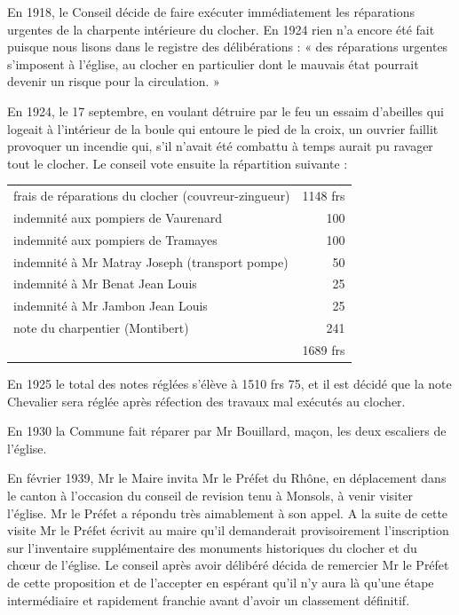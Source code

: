 En 1918, le Conseil décide de faire exécuter immédiatement les réparations urgentes de la charpente intérieure du clocher. En 1924 rien n'a encore été fait puisque nous lisons dans le registre des délibérations : « des réparations urgentes s'imposent à l'église, au clocher en particulier dont le mauvais état pourrait devenir un risque pour la circulation. »

En 1924, le 17 septembre, en voulant détruire par le feu un essaim d'abeilles qui logeait à l'intérieur de la boule qui entoure le pied de la croix, un ouvrier faillit provoquer un incendie qui, s'il n'avait été combattu à temps aurait pu ravager tout le clocher. Le conseil vote ensuite la répartition suivante :

\begin{center}
\begin{tabular}{@{}p{}r@{}}
frais de réparations du clocher (couvreur-zingueur) & 1148 frs \\
indemnité aux pompiers de Vaurenard & 100 \\
indemnité aux pompiers de Tramayes & 100 \\
indemnité à Mr Matray Joseph (transport pompe) & 50 \\
indemnité à Mr Benat Jean Louis & 25 \\
indemnité à Mr Jambon Jean Louis & 25 \\
note du charpentier (Montibert) & 241 \\
\multicolumn{2}{r}{1689 frs}
\end{tabular}
\end{center}

En 1925 le total des notes réglées s'élève à 1510 frs 75, et il est décidé que la note Chevalier sera réglée après réfection des travaux mal exécutés au clocher.

En 1930 la Commune fait réparer par Mr Bouillard, maçon, les deux escaliers de l'église.

En février 1939, Mr le Maire invita Mr le Préfet du Rhône, en déplacement dans le canton à l'occasion du conseil de revision tenu à Monsols, à venir visiter l'église. Mr le Préfet a répondu très aimablement à son appel. A la suite de cette visite Mr le Préfet écrivit au maire qu'il demanderait provisoirement l'inscription sur l'inventaire supplémentaire des monuments historiques du clocher et du chœur de l'église. Le conseil après avoir délibéré décida de remercier Mr le Préfet de cette proposition et de l'accepter en espérant qu'il n'y aura là qu'une étape intermédiaire et rapidement franchie avant d'avoir un classement définitif.


